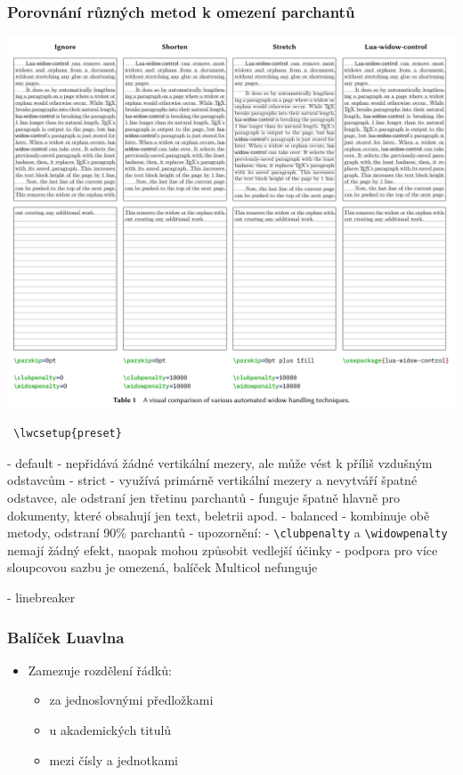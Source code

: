 \begin{frame}
  \frametitle{Porovnání různých metod k omezení parchantů}
  \begin{center}
  \includegraphics[height=.95\textheight]{img/lua-widow.pdf}
  \end{center}
\end{frame}

\begin{frame}[fragile]
 \begin{verbatim}
 \lwcsetup{preset}
 \end{verbatim}
      - default - nepřidává žádné vertikální mezery, ale může vést k příliš vzdušným odstavcům
      - strict - využívá primárně vertikální mezery a nevytváří špatné odstavce,  ale odstraní jen třetinu parchantů
        - funguje špatně hlavně pro dokumenty, které obsahují jen text, beletrii apod.
      - balanced - kombinuje obě metody, odstraní 90\% parchantů
    - upozornění:
      - \verb|\clubpenalty| a \verb|\widowpenalty| nemají žádný efekt, naopak mohou způsobit vedlejší účinky
      - podpora pro více sloupcovou sazbu je omezená, balíček Multicol nefunguje
\end{frame}
  - linebreaker

 

\begin{frame}[fragile]
  \frametitle{Balíček Luavlna}
  \begin{itemize}
    \item Zamezuje rozdělení řádků:
      \begin{itemize}
        \item za jednoslovnými předložkami
        \item u akademických titulů
        \item mezi čísly a jednotkami
      \end{itemize}
  \end{itemize}
\end{frame}

